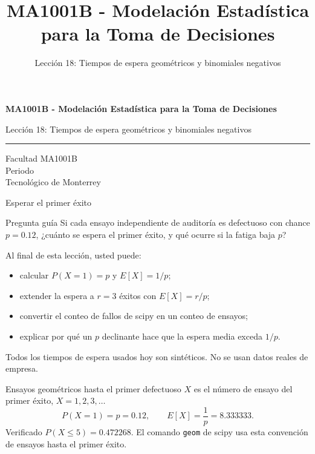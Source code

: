 \documentclass[aspectratio=169,10pt,spanish]{beamer}
\title{MA1001B - Modelación Estadística para la Toma de Decisiones}
\subtitle{Lección 18: Tiempos de espera geométricos y binomiales negativos}
\author{}
\institute{Tecnol\'ogico de Monterrey}
\date{}
\begin{document}
\begin{frame}[plain]
  \vspace{1.2cm}
  {\Large\bfseries MA1001B - Modelación Estadística para la Toma de Decisiones\par}
  \vspace{0.7cm}
  {\large Lección 18: Tiempos de espera geométricos y binomiales negativos\par}
  \vspace{0.7cm}
  {\color{TecRojo}\rule{\textwidth}{1.2pt}}
  \vspace{0.8cm}

  Facultad MA1001B\\[0.3cm]
  Periodo\\[0.3cm]
  Tecnol\'ogico de Monterrey
\end{frame}

\begin{frame}{Esperar el primer éxito}
  \begin{alertblock}{Pregunta guía}
    Si cada ensayo independiente de auditoría es defectuoso con chance
    $p=0.12$, ¿cuánto se espera el primer éxito, y qué ocurre si la fatiga
    baja $p$?
  \end{alertblock}

  \vspace{0.6em}
  Al final de esta lección, usted puede:
  \begin{itemize}
    \item calcular $P(X=1)=p$ y $E[X]=1/p$;
    \item extender la espera a $r=3$ éxitos con $E[X]=r/p$;
    \item convertir el conteo de fallos de scipy en un conteo de ensayos;
    \item explicar por qué un $p$ declinante hace que la espera media exceda $1/p$.
  \end{itemize}

  \vfill
  \scriptsize Todos los tiempos de espera usados hoy son sintéticos. No se usan datos reales de empresa.
\end{frame}

\begin{frame}{Ensayos geométricos hasta el primer defectuoso}
  \small
  $X$ es el número de ensayo del primer éxito, $X=1,2,3,\ldots$
  \[
    P(X=1)=p=0.12,\qquad E[X]=\frac{1}{p}=8.333333.
  \]
  Verificado $P(X\le 5)=0.472268$. El comando \texttt{geom} de scipy usa esta
  convención de ensayos hasta el primer éxito.
\end{frame}
\end{document}
